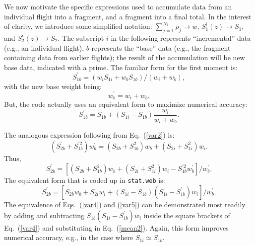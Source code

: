 \documentclass[12pt]{report}
\begin{document}
We now motivate the specific expressions used to accumulate
data from an individual flight into a fragment, and a fragment
into a final total.
In the interest of clarity, 
we introduce some simplified notation:
$\sum_{j = 1}^{N_{i}} \rho_{j} \rightarrow w$,
$S_{1}^{i}(z) \rightarrow S_{1}$, and $S_{2}^{i}(z) \rightarrow S_{2}$.
The subscript $i$ in the following represents ``incremental'' data
(e.g., an individual flight), $b$ represents the ``base'' data
(e.g., the fragment containing data from earlier flights);
the result of the accumulation will be new base data, indicated
with a prime.
The familiar form for the first moment is:
\begin{equation}
S_{1b}^{\prime} = (w_{i} S_{1i} + w_{b} S_{1b}) / (w_{i} + w_{b}),
\label{mean2}
\end{equation}
with the new base weight being:
\begin{equation}
w_{b}^{\prime} = w_{i} + w_{b}.
\label{weight}
\end{equation}
But, the code actually uses an equivalent form to maximize
numerical accuracy:
\begin{equation}
S_{1b}^{\prime} = S_{1b} + (S_{1i} - S_{1b})\frac{w_{i}}{w_{i} + w_{b}}.
\end{equation}

The analogous expression following from Eq.~(\ref{var2}) is:
\begin{equation}
(S_{2b}^{\prime} + S_{1b}^{\prime 2} ) w_{b}^{\prime}
= (S_{2b} + S_{1b}^{2}) w_{b} 
+ (S_{2i} + S_{1i}^{2}) w_{i}.
\label{var3}
\end{equation}
Thus,
\begin{equation}
S_{2b}^{\prime} = [(S_{2b} + S_{1b}^{2}) w_{b} 
+ (S_{2i} + S_{1i}^{2}) w_{i} - S_{1b}^{\prime 2} w_{b}^{\prime} ] / w_{b}^{\prime}.
\label{var4}
\end{equation}
The equivalent form that is coded up in {\tt stat.web} is:
\begin{equation}
S_{2b}^{\prime} = [S_{2b} w_{b} + S_{2i} w_{i} 
+ (S_{1i} - S_{1b})(S_{1i} - S_{1b}^{\prime}) w_{i} ] / w_{b}^{\prime}.
\label{var5}
\end{equation}
The equivalence of Eqs.~(\ref{var4}) and (\ref{var5}) can be
demonstrated most readily by adding and subtracting 
$S_{1b}(S_{1i} - S_{1b}^{\prime}) w_{i}$ inside the square brackets of
Eq.~(\ref{var4}) and substituting in Eq.~(\ref{mean2}).  Again,
this form improves numerical accuracy, e.g., in the case
where $S_{1i} \simeq S_{1b}$.
\end{document}
